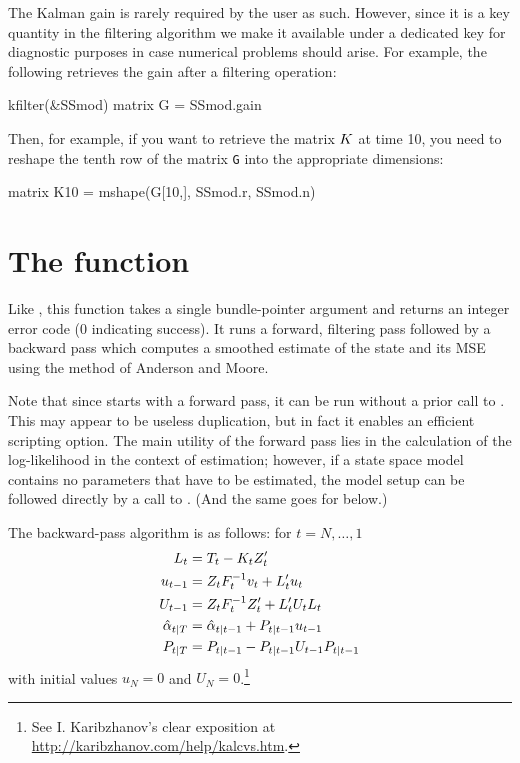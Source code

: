The Kalman gain is rarely required by the user as such. However, since
it is a key quantity in the filtering algorithm we make it available
under a dedicated key for diagnostic purposes in case numerical
problems should arise. For example, the following retrieves the gain
after a filtering operation:
%
\begin{code}
kfilter(&SSmod)
matrix G = SSmod.gain
\end{code}

Then, for example, if you want to retrieve the matrix $K$ at time
10, you need to reshape the tenth row of the matrix \texttt{G} into
the appropriate dimensions:
\begin{code}
matrix K10 = mshape(G[10,], SSmod.r, SSmod.n)
\end{code}

\section{The  function}
\label{sec:ksmooth}

Like , this function takes a single bundle-pointer
argument and returns an integer error code (0 indicating success).  It
runs a forward, filtering pass followed by a backward pass which
computes a smoothed estimate of the state and its MSE using the method
of Anderson and Moore.

Note that since  starts with a forward pass, it can be
run without a prior call to . This may appear to be
useless duplication, but in fact it enables an efficient scripting
option.  The main utility of the forward pass lies in the calculation
of the log-likelihood in the context of estimation; however, if a
state space model contains no parameters that have to be estimated,
the model setup can be followed directly by a call to
. (And the same goes for  below.)

The backward-pass algorithm is as follows: for $t=N,\dots,1$
%
\begin{align*}
L_t &= T_t - K_t Z_t' \\
u_{t-1} &= Z_t F_t^{-1} v_t
 + L_t' u_t \\
U_{t-1} &= Z_t F_t^{-1} Z_t' +
  L_t' U_t L_t \\
\hat{\alpha}_{t|T} &= \hat{\alpha}_{t|t-1} +
  P_{t|t-1} u_{t-1} \\
P_{t|T} &= P_{t|t-1} -
  P_{t|t-1} U_{t-1} P_{t|t-1}
\end{align*}
%
with initial values $u_N = 0$ and $U_N =
0$.\footnote{See I. Karibzhanov's clear exposition at
\url{http://karibzhanov.com/help/kalcvs.htm}.}

